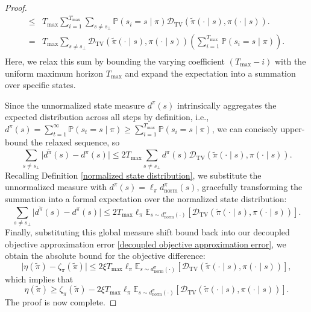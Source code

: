 \documentclass{article}
\theoremstyle{plain}
\theoremstyle{definition}
\theoremstyle{remark}
\begin{document}
\begin{proof}
\begin{equation}
\begin{split}
			\leq& T_{\max} \sum_{i=1}^{T_{\max}} \sum_{s \neq s_\bot} \mathbb{P}(s_i = s \mid \pi) \mathcal{D}_{\mathrm{TV}}(\tilde{\pi}(\cdot \mid s), \pi(\cdot \mid s)).\\
			=&T_{\max} \sum_{s \neq s_\bot} \mathcal{D}_{\mathrm{TV}}(\tilde{\pi}(\cdot \mid s), \pi(\cdot \mid s)) \left( \sum_{i=1}^{T_{\max}} \mathbb{P}(s_i = s \mid \pi) \right).\\
		\end{split}
	\end{equation}
	Here, we relax this sum by bounding the varying coefficient $(T_{\max} - i)$ with the uniform maximum horizon $T_{\max}$ and expand the expectation into a summation over specific states.
	
	Since the unnormalized state measure $d^\pi(s)$ intrinsically aggregates the expected distribution across all steps by definition, i.e., $d^\pi(s) = \sum_{t=1}^{\infty}\mathbb{P}(s_t = s \mid \pi) \geq \sum_{i=1}^{T_{\max}} \mathbb{P}(s_i = s \mid \pi)$, we can concisely upper-bound the relaxed sequence, so
	\begin{equation}
		\sum_{s \neq s_\bot} \lvert d^{\tilde{\pi}}(s) - d^\pi(s) \rvert \leq 2T_{\max} \sum_{s \neq s_\bot} d^\pi(s)\mathcal{D}_{\mathrm{TV}}(\tilde{\pi}(\cdot \mid s), \pi(\cdot \mid s)).
	\end{equation}
	Recalling Definition \ref{normalized state distribution}, we substitute the unnormalized measure with $d^\pi(s) = \ell_\pi d^\pi_{\mathrm{norm}}(s)$, gracefully transforming the summation into a formal expectation over the normalized state distribution:
	\begin{equation}
		\sum_{s \neq s_\bot} \lvert d^{\tilde{\pi}}(s) - d^\pi(s) \rvert \leq 2T_{\max}\ell_\pi\mathbb{E}_{s \sim d^{\pi}_{\mathrm{norm}}(\cdot)}\left[\mathcal{D}_{\mathrm{TV}}(\tilde{\pi}(\cdot \mid s),\pi(\cdot \mid s))\right].
	\end{equation}
	Finally, substituting this global measure shift bound back into our decoupled objective approximation error \eqref{decoupled objective approximation error}, we obtain the absolute bound for the objective difference:
	\begin{equation}
		\lvert \eta(\tilde{\pi}) - \zeta_\pi(\tilde{\pi}) \rvert \leq 2\xi T_{\max}\ell_\pi\mathbb{E}_{s \sim d^{\pi}_{\mathrm{norm}}(\cdot)}\left[\mathcal{D}_{\mathrm{TV}}(\tilde{\pi}(\cdot \mid s),\pi(\cdot \mid s))\right],
	\end{equation}
	which implies that
	\begin{equation}
		\eta(\tilde{\pi})\geq\zeta_\pi(\tilde{\pi}) - 2\xi T_{\max}\ell_\pi\mathbb{E}_{s \sim d^{\pi}_{\mathrm{norm}}(\cdot)}\left[\mathcal{D}_{\mathrm{TV}}(\tilde{\pi}(\cdot \mid s),\pi(\cdot \mid s))\right].
	\end{equation}
	The proof is now complete.
\end{proof}



\end{document}
